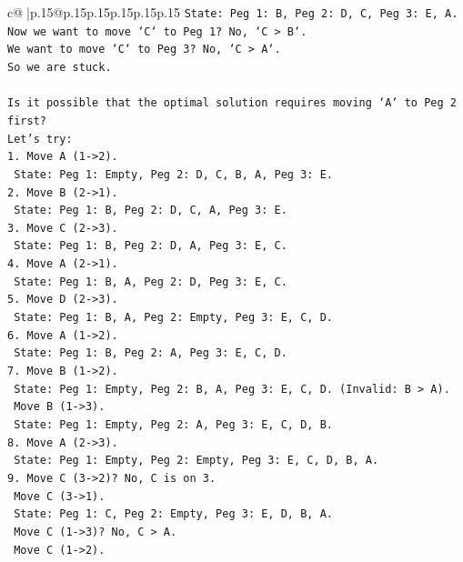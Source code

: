 \documentclass{article}
\begin{document}
{\begin{supertabular}{c@{$\;$}|p{.15\linewidth}@{}p{.15\linewidth}p{.15\linewidth}p{.15\linewidth}p{.15\linewidth}p{.15\linewidth}}
{{{\texttt{State: Peg 1: B, Peg 2: D, C, Peg 3: E, A.} \\
\texttt{Now we want to move `C` to Peg 1? No, `C > B`.} \\
\texttt{We want to move `C` to Peg 3? No, `C > A`.} \\
\texttt{So we are stuck.} \\
\\ 
\texttt{Is it possible that the optimal solution requires moving `A` to Peg 2 first?} \\
\texttt{Let's try:} \\
\texttt{1. Move A (1{-}>2).} \\
\texttt{   State: Peg 1: Empty, Peg 2: D, C, B, A, Peg 3: E.} \\
\texttt{2. Move B (2{-}>1).} \\
\texttt{   State: Peg 1: B, Peg 2: D, C, A, Peg 3: E.} \\
\texttt{3. Move C (2{-}>3).} \\
\texttt{   State: Peg 1: B, Peg 2: D, A, Peg 3: E, C.} \\
\texttt{4. Move A (2{-}>1).} \\
\texttt{   State: Peg 1: B, A, Peg 2: D, Peg 3: E, C.} \\
\texttt{5. Move D (2{-}>3).} \\
\texttt{   State: Peg 1: B, A, Peg 2: Empty, Peg 3: E, C, D.} \\
\texttt{6. Move A (1{-}>2).} \\
\texttt{   State: Peg 1: B, Peg 2: A, Peg 3: E, C, D.} \\
\texttt{7. Move B (1{-}>2).} \\
\texttt{   State: Peg 1: Empty, Peg 2: B, A, Peg 3: E, C, D. (Invalid: B > A).} \\
\texttt{   Move B (1{-}>3).} \\
\texttt{   State: Peg 1: Empty, Peg 2: A, Peg 3: E, C, D, B.} \\
\texttt{8. Move A (2{-}>3).} \\
\texttt{   State: Peg 1: Empty, Peg 2: Empty, Peg 3: E, C, D, B, A.} \\
\texttt{9. Move C (3{-}>2)? No, C is on 3.} \\
\texttt{   Move C (3{-}>1).} \\
\texttt{   State: Peg 1: C, Peg 2: Empty, Peg 3: E, D, B, A.} \\
\texttt{   Move C (1{-}>3)? No, C > A.} \\
\texttt{   Move C (1{-}>2).} \\
}}}
\end{supertabular}}
\end{document}

